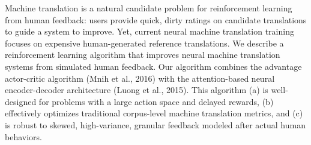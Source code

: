 Machine translation is a natural candidate problem for reinforcement learning from human feedback: users provide quick, dirty ratings on candidate translations to guide a system to improve. Yet, current neural machine translation training focuses on expensive human-generated reference translations. We describe a reinforcement learning algorithm that improves neural machine translation systems from simulated human feedback. Our algorithm combines the advantage actor-critic algorithm (Mnih et al., 2016) with the attention-based neural encoder-decoder architecture (Luong et al., 2015). This algorithm (a) is well-designed for problems with a large action space and delayed rewards, (b) effectively optimizes traditional corpus-level machine translation metrics, and (c) is robust to skewed, high-variance, granular feedback modeled after actual human behaviors.
